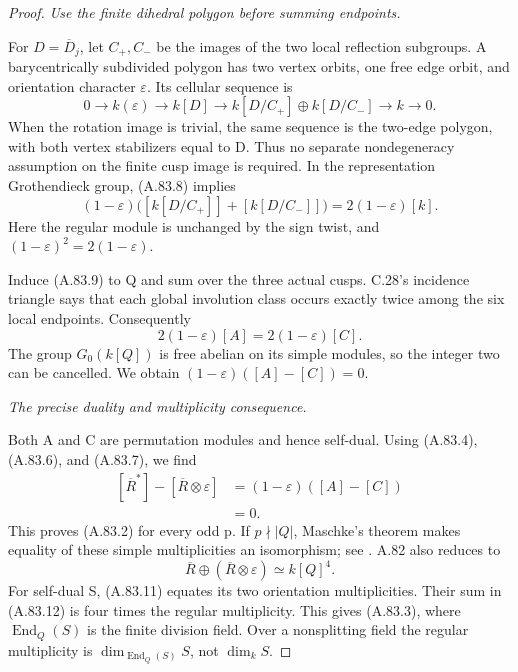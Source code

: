 \begin{proof}
\emph{Use the finite dihedral polygon before summing
endpoints.}\par
For \(D=\overline D_j\), let \(C_+,C_-\) be the
images of the two local reflection subgroups. A
barycentrically subdivided polygon has two vertex orbits,
one free edge orbit, and orientation character
\(\varepsilon\). Its cellular sequence is
\[
 0\longrightarrow k(\varepsilon)\longrightarrow k[D]
 \longrightarrow k[D/C_+]\oplus k[D/C_-]
 \longrightarrow k\longrightarrow0.
 \tag{A.83.8}
\]
When the rotation image is trivial, the same sequence is
the two-edge polygon, with both vertex stabilizers equal
to D. Thus no separate nondegeneracy assumption on the
finite cusp image is required. In the representation
Grothendieck group, (A.83.8) implies
\[
 (1-\varepsilon)\bigl([k[D/C_+]]+[k[D/C_-]]\bigr)
                              =2(1-\varepsilon)[k].
 \tag{A.83.9}
\]
Here the regular module is unchanged by the sign twist,
and \((1-\varepsilon)^2=2(1-\varepsilon)\).

Induce (A.83.9) to Q and sum over the three actual
cusps. C.28's incidence triangle says that each global
involution class occurs exactly twice among the six
local endpoints. Consequently
\[
                     2(1-\varepsilon)[A]
                              =2(1-\varepsilon)[C].
 \tag{A.83.10}
\]
The group \(G_0(k[Q])\) is free abelian on its simple
modules, so the integer two can be cancelled. We obtain
\((1-\varepsilon)([A]-[C])=0\).

\emph{The precise duality and multiplicity consequence.}\par
Both A and C are permutation modules and hence self-dual.
Using (A.83.4), (A.83.6), and (A.83.7), we find
\[
 \begin{split}
 [\overline R^*]-[\overline R\otimes\varepsilon]
              &=(1-\varepsilon)([A]-[C])\\
              &=0.
 \end{split}
 \tag{A.83.11}
\]
This proves (A.83.2) for every odd p. If \(p\nmid|Q|\),
Maschke's theorem makes equality of these simple
multiplicities an isomorphism; see
\citet[Theorem~7.4 and Proposition~7.9]{AMilne2025}.
A.82 also reduces to
\[
             \overline R\oplus(\overline R\otimes\varepsilon)
                                      \simeq k[Q]^4.
 \tag{A.83.12}
\]
For self-dual S, (A.83.11) equates its two orientation
multiplicities. Their sum in (A.83.12) is four times
the regular multiplicity. This gives (A.83.3), where
\(\operatorname{End}_Q(S)\) is the finite division
field. Over a nonsplitting field the regular multiplicity
is \(\dim_{\operatorname{End}_Q(S)}S\), not
\(\dim_k S\).


\end{proof}
